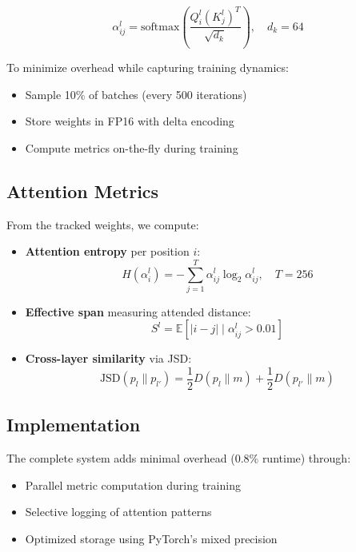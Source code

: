 \documentclass{article} %
\begin{document}
\begin{equation}
    \alpha_{ij}^l = \text{softmax}\left(\frac{Q_i^l(K_j^l)^T}{\sqrt{d_k}}\right), \quad d_k=64
\end{equation}

To minimize overhead while capturing training dynamics:
\begin{itemize}
    \item Sample 10\% of batches (every 500 iterations)
    \item Store weights in FP16 with delta encoding
    \item Compute metrics on-the-fly during training
\end{itemize}

\subsection{Attention Metrics}
From the tracked weights, we compute:

\begin{itemize}
    \item \textbf{Attention entropy} per position $i$:
    \begin{equation}
        H(\alpha_i^l) = -\sum_{j=1}^{T} \alpha_{ij}^l \log_2 \alpha_{ij}^l, \quad T=256
    \end{equation}
    
    \item \textbf{Effective span} measuring attended distance:
    \begin{equation}
        S^l = \mathbb{E}[|i-j| \mid \alpha_{ij}^l > 0.01]
    \end{equation}
    
    \item \textbf{Cross-layer similarity} via JSD:
    \begin{equation}
        \text{JSD}(p_l \| p_{l'}) = \frac{1}{2} D(p_l \| m) + \frac{1}{2} D(p_{l'} \| m)
    \end{equation}
\end{itemize}

\subsection{Implementation}
The complete system adds minimal overhead (0.8\% runtime) through:
\begin{itemize}
    \item Parallel metric computation during training
    \item Selective logging of attention patterns
    \item Optimized storage using PyTorch's mixed precision
\end{itemize}
\end{document}
